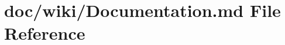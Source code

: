 \hypertarget{_documentation_8md}{}\section{doc/wiki/\+Documentation.md File Reference}
\label{_documentation_8md}
